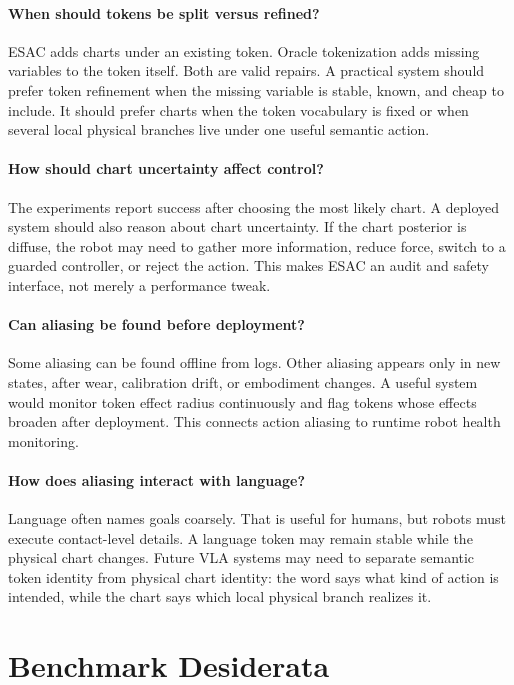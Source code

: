 \documentclass{article}
\begin{document}
\paragraph{When should tokens be split versus refined?}
ESAC adds charts under an existing token. Oracle tokenization adds missing
variables to the token itself. Both are valid repairs. A practical system
should prefer token refinement when the missing variable is stable, known, and
cheap to include. It should prefer charts when the token vocabulary is fixed or
when several local physical branches live under one useful semantic action.

\paragraph{How should chart uncertainty affect control?}
The experiments report success after choosing the most likely chart. A deployed
system should also reason about chart uncertainty. If the chart posterior is
diffuse, the robot may need to gather more information, reduce force, switch to
a guarded controller, or reject the action. This makes ESAC an audit and safety
interface, not merely a performance tweak.

\paragraph{Can aliasing be found before deployment?}
Some aliasing can be found offline from logs. Other aliasing appears only in
new states, after wear, calibration drift, or embodiment changes. A useful
system would monitor token effect radius continuously and flag tokens whose
effects broaden after deployment. This connects action aliasing to runtime
robot health monitoring.

\paragraph{How does aliasing interact with language?}
Language often names goals coarsely. That is useful for humans, but robots must
execute contact-level details. A language token may remain stable while the
physical chart changes. Future VLA systems may need to separate semantic token
identity from physical chart identity: the word says what kind of action is
intended, while the chart says which local physical branch realizes it.

\section{Benchmark Desiderata}
\end{document}
